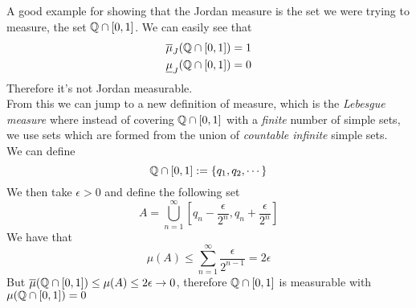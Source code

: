 \documentclass[../complete.tex]{subfiles}
\begin{document}
\begin{rmk}
	A good example for showing that the Jordan measure is the set we were trying to measure, the set $\mathbb{Q}\cap[0,1]$. We can easily see that
	\begin{equation*}
		\begin{aligned}
			\overline{\mu}_J(\mathbb{Q}\cap[0,1])&=1\\
			\underline{\mu}_J(\mathbb{Q}\cap[0,1])&=0
		\end{aligned}
	\end{equation*}
	Therefore it's not Jordan measurable.\\
	From this we can jump to a new definition of measure, which is the \textit{Lebesgue measure} where instead of covering $\mathbb{Q}\cap[0,1]$ with a \textit{finite} number of simple sets, we use sets which are formed from the union of \textit{countable infinite} simple sets.\\
	We can define
	\begin{equation*}
		\mathbb{Q}\cap[0,1]:=\{q_1,q_2,\cdots\}
	\end{equation*}
	We then take $\epsilon>0$ and define the following set
	\begin{equation*}
		A=\bigcup_{n=1}^\infty\left[ q_n-\frac{\epsilon}{2^n},q_n+\frac{\epsilon}{2^n} \right]
	\end{equation*}
	We have that
	\begin{equation*}
		\mu(A)\le\sum_{n=1}^\infty\frac{\epsilon}{2^{n-1}}=2\epsilon
	\end{equation*}
	But $\overline{\mu}(\mathbb{Q}\cap[0,1])\le\mu(A)\le2\epsilon\to0$, therefore $\mathbb{Q}\cap[0,1]$ is measurable with $\mu(\mathbb{Q}\cap[0,1])=0$
\end{rmk}
\end{document}
